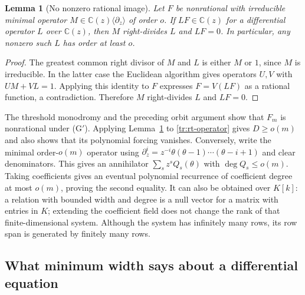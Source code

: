\documentclass[11pt,a4paper]{article}
\newtheorem{lemma}[theorem]{Lemma}
\theoremstyle{definition}
\theoremstyle{remark}
\numberwithin{equation}{section}
\begin{document}
\begin{lemma}[No nonzero rational image]
\label{tr:rt-no-rational-image}
Let $F$ be nonrational with irreducible minimal operator
$M\in\mathbb C(z)\langle\partial_z\rangle$ of order $o$.
If $LF\in\mathbb C(z)$ for a differential operator $L$ over
$\mathbb C(z)$, then $M$ right-divides $L$ and $LF=0$.
In particular, any nonzero such $L$ has order at least $o$.
\end{lemma}
\begin{proof}
The greatest common right divisor of $M$ and $L$ is either $M$
or $1$, since $M$ is irreducible.  In the latter case the Euclidean
algorithm gives operators $U,V$ with $UM+VL=1$.  Applying this
identity to $F$ expresses $F=V(LF)$ as a rational function, a
contradiction.  Therefore $M$ right-divides $L$ and $LF=0$.
\end{proof}

The threshold monodromy and the preceding orbit argument show
that $F_m$ is nonrational under \textup{(G$'$)}.  Applying
Lemma~\ref{tr:rt-no-rational-image} to \eqref{tr:rt-operator} gives
$D\ge o(m)$ and also shows that its polynomial forcing vanishes.
Conversely, write the minimal order-$o(m)$ operator using
$\partial_z^i=z^{-i}\theta(\theta-1)\cdots(\theta-i+1)$ and
clear denominators.  This gives an annihilator
$\sum_s z^s Q_s(\theta)$ with $\deg Q_s\le o(m)$.
Taking coefficients gives an eventual polynomial recurrence of
coefficient degree at most $o(m)$, proving the second equality.
It can also be obtained over $K[k]$: a relation with bounded width
and degree is a null vector for a matrix with entries in $K$;
extending the coefficient field does not change the rank of that
finite-dimensional system.  Although the system has infinitely
many rows, its row span is generated by finitely many rows.

\subsection{What minimum width says about a differential equation}
\end{document}
